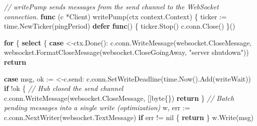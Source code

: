 \documentclass[
]{article}
\newenvironment{Shaded}{}{}
\newcommand{\CommentTok}[1]{\textcolor[rgb]{0.38,0.63,0.69}{\textit{#1}}}
\newcommand{\ControlFlowTok}[1]{\textcolor[rgb]{0.00,0.44,0.13}{\textbf{#1}}}
\newcommand{\DataTypeTok}[1]{\textcolor[rgb]{0.56,0.13,0.00}{#1}}
\newcommand{\KeywordTok}[1]{\textcolor[rgb]{0.00,0.44,0.13}{\textbf{#1}}}
\newcommand{\NormalTok}[1]{#1}
\newcommand{\OperatorTok}[1]{\textcolor[rgb]{0.40,0.40,0.40}{#1}}
\newcommand{\OtherTok}[1]{\textcolor[rgb]{0.00,0.44,0.13}{#1}}
\newcommand{\StringTok}[1]{\textcolor[rgb]{0.25,0.44,0.63}{#1}}
\begin{document}
\begin{Shaded}
\begin{Highlighting}[]
\CommentTok{// writePump sends messages from the send channel to the WebSocket connection.}
\KeywordTok{func} \OperatorTok{(}\NormalTok{c }\OperatorTok{*}\NormalTok{Client}\OperatorTok{)}\NormalTok{ writePump}\OperatorTok{(}\NormalTok{ctx context}\OperatorTok{.}\NormalTok{Context}\OperatorTok{)} \OperatorTok{\{}
\NormalTok{    ticker }\OperatorTok{:=}\NormalTok{ time}\OperatorTok{.}\NormalTok{NewTicker}\OperatorTok{(}\NormalTok{pingPeriod}\OperatorTok{)}
    \ControlFlowTok{defer} \KeywordTok{func}\OperatorTok{()} \OperatorTok{\{}
\NormalTok{        ticker}\OperatorTok{.}\NormalTok{Stop}\OperatorTok{()}
\NormalTok{        c}\OperatorTok{.}\NormalTok{conn}\OperatorTok{.}\NormalTok{Close}\OperatorTok{()}
    \OperatorTok{\}()}

    \ControlFlowTok{for} \OperatorTok{\{}
        \ControlFlowTok{select} \OperatorTok{\{}
        \ControlFlowTok{case} \OperatorTok{\textless{}{-}}\NormalTok{ctx}\OperatorTok{.}\NormalTok{Done}\OperatorTok{():}
\NormalTok{            c}\OperatorTok{.}\NormalTok{conn}\OperatorTok{.}\NormalTok{WriteMessage}\OperatorTok{(}\NormalTok{websocket}\OperatorTok{.}\NormalTok{CloseMessage}\OperatorTok{,}
\NormalTok{                websocket}\OperatorTok{.}\NormalTok{FormatCloseMessage}\OperatorTok{(}\NormalTok{websocket}\OperatorTok{.}\NormalTok{CloseGoingAway}\OperatorTok{,} \StringTok{"server shutdown"}\OperatorTok{))}
            \ControlFlowTok{return}

        \ControlFlowTok{case}\NormalTok{ msg}\OperatorTok{,}\NormalTok{ ok }\OperatorTok{:=} \OperatorTok{\textless{}{-}}\NormalTok{c}\OperatorTok{.}\NormalTok{send}\OperatorTok{:}
\NormalTok{            c}\OperatorTok{.}\NormalTok{conn}\OperatorTok{.}\NormalTok{SetWriteDeadline}\OperatorTok{(}\NormalTok{time}\OperatorTok{.}\NormalTok{Now}\OperatorTok{().}\NormalTok{Add}\OperatorTok{(}\NormalTok{writeWait}\OperatorTok{))}
            \ControlFlowTok{if} \OperatorTok{!}\NormalTok{ok }\OperatorTok{\{}
                \CommentTok{// Hub closed the send channel}
\NormalTok{                c}\OperatorTok{.}\NormalTok{conn}\OperatorTok{.}\NormalTok{WriteMessage}\OperatorTok{(}\NormalTok{websocket}\OperatorTok{.}\NormalTok{CloseMessage}\OperatorTok{,} \OperatorTok{[]}\DataTypeTok{byte}\OperatorTok{\{\})}
                \ControlFlowTok{return}
            \OperatorTok{\}}
            \CommentTok{// Batch pending messages into a single write (optimization)}
\NormalTok{            w}\OperatorTok{,}\NormalTok{ err }\OperatorTok{:=}\NormalTok{ c}\OperatorTok{.}\NormalTok{conn}\OperatorTok{.}\NormalTok{NextWriter}\OperatorTok{(}\NormalTok{websocket}\OperatorTok{.}\NormalTok{TextMessage}\OperatorTok{)}
            \ControlFlowTok{if}\NormalTok{ err }\OperatorTok{!=} \OtherTok{nil} \OperatorTok{\{}
                \ControlFlowTok{return}
            \OperatorTok{\}}
\NormalTok{            w}\OperatorTok{.}\NormalTok{Write}\OperatorTok{(}\NormalTok{msg}\OperatorTok{)}


\end{Highlighting}
\end{Shaded}
\end{document}

